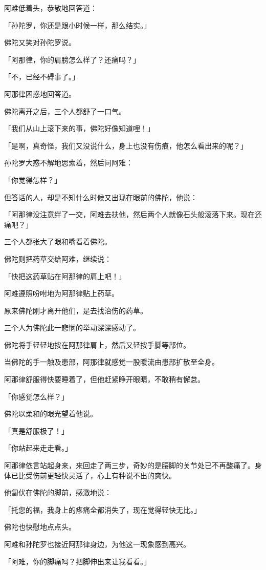 \documentclass[twoside,openany]{book}
\begin{document}
阿难低着头，恭敬地回答道：

「孙陀罗，你还是跟小时候一样，那么结实。」

佛陀又笑对孙陀罗说。

「阿那律，你的肩膀怎么样了？还痛吗？」

「不，已经不碍事了。」

阿那律困惑地回答道。

佛陀离开之后，三个人都舒了一口气。

「我们从山上滚下来的事，佛陀好像知道哩！」

「是啊，真奇怪，我们又没说什么，身上也没有伤痕，他怎么看出来的呢？」

孙陀罗大惑不解地思索着，然后问阿难：

「你觉得怎样？」

但答话的人，却是不知什么时候又出现在眼前的佛陀，他说：

「阿那律没注意绊了一交，阿难去扶他，然后两个人就像石头般滚落下来。现在还痛吧？」

三个人都张大了眼和嘴看着佛陀。

佛陀则把药草交给阿难，继续说：

「快把这药草贴在阿那律的肩上吧！」

阿难遵照吩咐地为阿那律贴上药草。

原来佛陀刚才离开他们，是去找治伤的药草。

三个人为佛陀此一悲悯的举动深深感动了。

佛陀将手轻轻地按在阿那律肩上，然后又轻按手脚等部位。

当佛陀的手一触及患部，阿那律就感觉一股暖流由患部扩散至全身。

阿那律舒服得快要睡着了，但他赶紧睁开眼睛，不敢稍有懈怠。

「你感觉怎么样？」

佛陀以柔和的眼光望着他说。

「真是舒服极了！」

「你站起来走走看。」

阿那律依言站起身来，来回走了两三步，奇妙的是腰脚的关节处已不再酸痛了。身体已比受伤前更轻快灵活了，心上有种说不出的爽快。

他匐伏在佛陀的脚前，感激地说：

「托您的福，我身上的疼痛全都消失了，现在觉得轻快无比。」

佛陀也快慰地点点头。

阿难和孙陀罗也接近阿那律身边，为他这一现象感到高兴。

「阿难，你的脚痛吗？把脚伸出来让我看看。」
\end{document}

